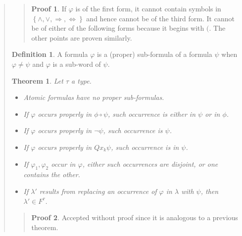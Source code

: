 \documentclass[a4paper, 12pt]{article}
\newtheorem{theorem}{Theorem}
\theoremstyle{definition}
\theoremstyle{definition}
\theoremstyle{definition}
\newtheorem{definition}{Definition}
\newtheorem{pro}{Proof}
\begin{document}
\begin{quote}
\begin{quote}
\begin{pro}
    If $\varphi$ is of the first form, it cannot contain symbols in $\left\{ \land , \lor , \Rightarrow, \iff  \right\} $ 
    and hence cannot be of the third form. It cannot be of either of the following forms 
    because it begins with $($. The other points are proven similarly.
\end{pro}

\end{quote}
\normalsize

\begin{definition}
    A formula $\varphi$ is a (proper) sub-formula of a formula $\psi$ when $\varphi \neq \psi$
    and $\varphi$ is a sub-word of $\psi$.
\end{definition}

\begin{theorem}
    Let $\tau$ a type. 

    \begin{itemize}
        \item Atomic formulas have no proper sub-formulas. 
        \item If $\varphi$ occurs properly in $\phi \circ \psi$, such occurrence 
            is either in $\psi$ or in $\phi$. 
        \item If $\varphi$ occurs properly in $\neg \psi$, such occurrence is $\psi$.
        \item If $\varphi$ occurs properly in $Q x_k \psi$, such occurrence is 
            in $\psi$.
        \item If $\varphi_1, \varphi_2$ occur in $\varphi$, either such occurrences 
            are disjoint, or one contains the other. 
        \item If $\lambda'$ results from replacing an occurrence of $\varphi$ in $\lambda$
            with $\psi$, then $\lambda' \in F^\tau$.
    \end{itemize}
\end{theorem}


\small
\begin{quote}

\begin{pro}
    Accepted without proof since it is analogous to a previous theorem.
\end{pro}

\end{quote}
\normalsize



\end{quote}
\end{document}
